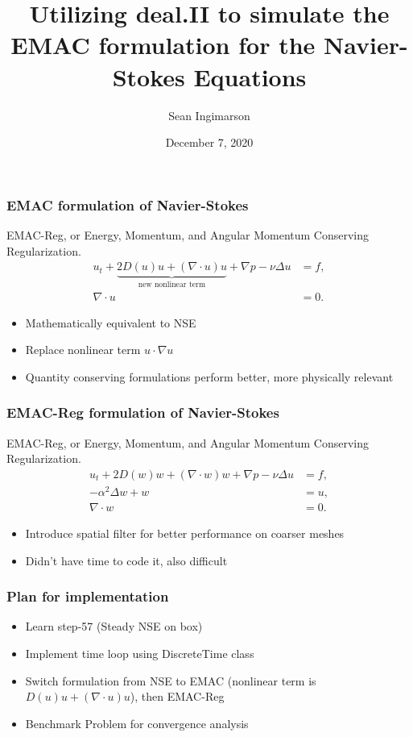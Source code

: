 \documentclass{beamer}
\title[]{Utilizing deal.II to simulate the EMAC formulation for the Navier-Stokes Equations} %
\author{Sean Ingimarson} %
\institute[Clemson] %
{
Clemson University \\ %
\medskip
\textit{Utilizing deal.II to simulate the EMAC formulation for the Navier-Stokes Equations}\\
}
\date{December 7, 2020} %
\newcommand{\divergence}{\nabla \cdot}
\begin{document}

\begin{frame}
\titlepage %
\end{frame}


\begin{frame}
\frametitle{EMAC formulation of Navier-Stokes}
EMAC-Reg, or Energy, Momentum, and Angular Momentum Conserving Regularization.
\begin{align}
u_t + \underbrace{2D(u)u+(\divergence u)u}_{\text{new nonlinear term}} + \nabla p - \nu\Delta u & = f, \label{reg1} \\
\divergence u & =0. \label{reg2}
\end{align}
\begin{itemize}
\item Mathematically equivalent to NSE
\item Replace nonlinear term $u \cdot \nabla u$
\item Quantity conserving formulations perform better, more physically relevant
\end{itemize}

\end{frame}


\begin{frame}
\frametitle{EMAC-Reg formulation of Navier-Stokes}
EMAC-Reg, or Energy, Momentum, and Angular Momentum Conserving Regularization.
\begin{align}
u_t + 2D(w)w+(\divergence w)w + \nabla p - \nu\Delta u & = f, \label{reg1} \\
-\alpha^2\Delta w + w & = u, \label{reg2a}\\
\divergence w & =0. \label{reg2}
\end{align}
\begin{itemize}
\item Introduce spatial filter for better performance on coarser meshes
\item Didn't have time to code it, also difficult
\end{itemize}

\end{frame}


\begin{frame}
\frametitle{Plan for implementation}
\begin{itemize}
\item Learn step-57 (Steady NSE on box)
\item Implement time loop using DiscreteTime class
\item Switch formulation from NSE to EMAC (nonlinear term is $D(u)u + (\divergence u)u$), then EMAC-Reg
\item Benchmark Problem for convergence analysis
\end{itemize}
\end{frame}
\end{document}
